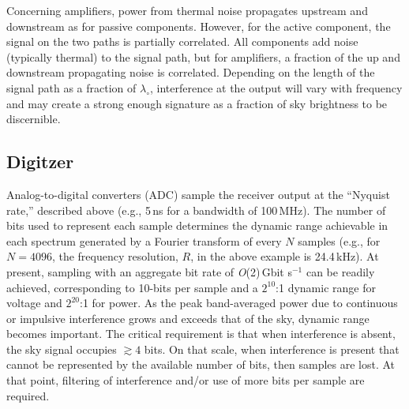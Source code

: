 Concerning amplifiers, power from thermal noise propagates upstream and downstream as for passive components.  However, for the active component, the signal on the two paths is partially correlated.  All components add noise (typically thermal) to the signal path, but for amplifiers, a fraction of the up and downstream propagating noise is correlated.  Depending on the length of the signal path as a fraction of $\lambda_\circ$, interference at the output will vary with frequency and may create a strong enough signature as a fraction of sky brightness to be discernible.


\subsection{Digitzer}
  
Analog-to-digital converters (ADC) sample the receiver output at the ``Nyquist rate,'' described above (e.g., 5\,ns for a bandwidth of 100\,MHz).  The number of bits used to represent each sample determines the dynamic range achievable in each spectrum generated by a Fourier transform of every $N$ samples (e.g., for $N=4096$, the frequency resolution, $R$, in the above example is 24.4\,kHz).  At present, sampling with an aggregate bit rate of {\it O}(2)\,Gbit s$^{-1}$ can be readily achieved, corresponding to 10-bits per sample and a $2^{10}$:1 dynamic range for voltage and $2^{20}$:1 for power.  As the peak band-averaged power due to continuous or impulsive interference grows and exceeds that of the sky, dynamic range becomes important.  The critical requirement is that when interference is absent, the sky signal occupies $\gtrsim 4$ bits.  On that scale, when interference is present that cannot be represented by the available number of bits, then samples are lost.  At that point, filtering of interference and/or use of more bits per sample are required.


   

